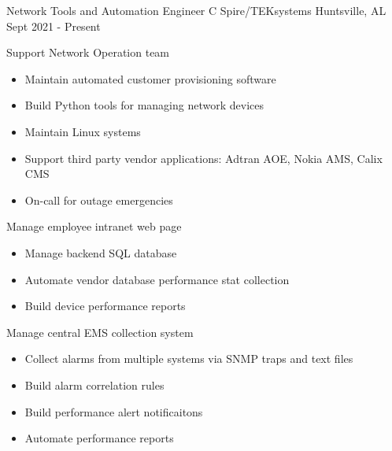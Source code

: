 
\begin{cventries}
  \cventry
    {Network Tools and Automation Engineer} %
    {C Spire/TEKsystems} %
    {Huntsville, AL} %
    {Sept 2021 - Present} %
    {
      \begin{cvitems} %
        \item {Support Network Operation team}
            \begin{itemize}
                \item {Maintain automated customer provisioning software}
                \item {Build Python tools for managing network devices}
                \item {Maintain Linux systems}
                \item {Support third party vendor applications: Adtran AOE, Nokia AMS, Calix CMS}
                \item {On-call for outage emergencies}
            \end{itemize}
        \item {Manage employee intranet web page}
            \begin{itemize}
                \item {Manage backend SQL database}
                \item {Automate vendor database performance stat collection}
                \item {Build device performance reports}
            \end{itemize}
        \item {Manage central EMS collection system}
            \begin{itemize}
                \item {Collect alarms from multiple systems via SNMP traps and text files}
                \item {Build alarm correlation rules}
                \item {Build performance alert notificaitons}
                \item {Automate performance reports}
            \end{itemize}
      \end{cvitems}
    }


\end{cventries}
